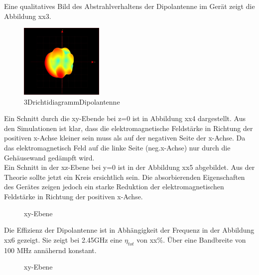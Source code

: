 Eine qualitatives Bild des Abstrahlverhaltens der Dipolantenne im Gerät zeigt die Abbildung xx3.\\
\begin{figure}[!ht]
	\centering
	\includegraphics[width=4cm]{content/bilder/Implementierung/min25_0_x_yhinten_zoben.JPG}%
	\caption{3DrichtidiagrammDipolantenne}
	\label{fig:3D Richtdiagramm }
\end{figure}
Ein Schnitt durch die xy-Ebende bei z=0 ist in Abbildung xx4 dargestellt. Aus den Simulationen ist klar, dass die elektromagnetische Feldstärke in Richtung der positiven x-Achse kleiner sein muss als auf der negativen Seite der x-Achse. Da das elektromagnetisch Feld auf die linke Seite (neg.x-Achse) nur durch die Gehäusewand gedämpft wird. \\
%	
Ein Schnitt in der xz-Ebene bei y=0 ist in der Abbildung xx5 abgebildet. Aus der Theorie sollte jetzt ein Kreis ersichtlich sein. Die absorbierenden Eigenschaften des Gerätes zeigen jedoch ein starke Reduktion der elektromagnetischen Feldstärke in Richtung der positiven x-Achse. \\
\begin{figure}[!ht]
	\centering
	\begingroup
	
	\endgroup
	\caption{xy-Ebene}\label{fig:Schnittgemessen}
\end{figure}
Die Effizienz der Dipolantenne ist in Abhängigkeit der Frequenz in der Abbildung xx6 gezeigt. Sie zeigt bei 2.45GHz eine $\eta_{tot}$ von xx$\%$. Über eine Bandbreite von 100 MHz annähernd konstant. \\
\begin{figure}[!ht]
	\centering
	\begingroup
	
	\endgroup
	\caption{xy-Ebene}\label{fig:Effizienz_gemessen}
\end{figure}



